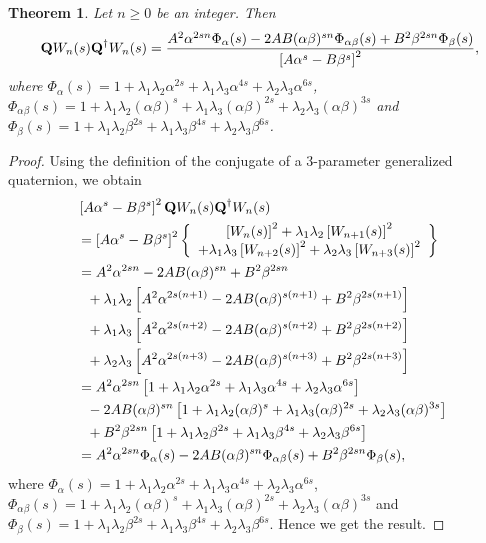 \documentclass{kms-c}
\theoremstyle{plain}
\newtheorem{theorem}{Theorem}[section]
\theoremstyle{definition}
\theoremstyle{remark}
\begin{document}
\begin{theorem}\label{t2}
Let $n\geq 0$ be an integer. Then
\[
\textnormal{\textbf{Q}}W_{n}(s)\textnormal{\textbf{Q}}^{\dagger}W_{n}(s)=\frac{A^{2}\alpha^{2sn}\Phi_{\alpha}(s)-2AB(\alpha\beta)^{sn}\Phi_{\alpha\beta}(s)+B^{2}\beta^{2sn}\Phi_{\beta}(s)}{\left[A\alpha^{s}-B\beta^{s}\right]^{2}},
\]
where $\Phi_{\alpha}(s)=1+\lambda_{1}\lambda_{2}\alpha^{2s}+\lambda_{1}\lambda_{3}\alpha^{4s}+\lambda_{2}\lambda_{3}\alpha^{6s}$, $\Phi_{\alpha\beta}(s)=1+\lambda_{1}\lambda_{2}(\alpha\beta)^{s}+\lambda_{1}\lambda_{3}(\alpha\beta)^{2s}+\lambda_{2}\lambda_{3}(\alpha\beta)^{3s}$ and $\Phi_{\beta}(s)=1+\lambda_{1}\lambda_{2}\beta^{2s}+\lambda_{1}\lambda_{3}\beta^{4s}+\lambda_{2}\lambda_{3}\beta^{6s}$.
\end{theorem}
\begin{proof}
Using the definition of the conjugate of a 3-parameter generalized quaternion, we obtain 
\begin{align*}
&\left[A\alpha^{s}-B\beta^{s}\right]^{2}\textnormal{\textbf{Q}}W_{n}(s)\textnormal{\textbf{Q}}^{\dagger}W_{n}(s)\\
&=\left[A\alpha^{s}-B\beta^{s}\right]^{2}\left\lbrace \begin{array}{c}  \left[W_{n}(s)\right]^{2}+\lambda_{1}\lambda_{2}\left[W_{n+1}(s)\right]^{2}\\
+ \lambda_{1}\lambda_{3}\left[W_{n+2}(s)\right]^{2}+\lambda_{2}\lambda_{3}\left[W_{n+3}(s)\right]^{2} \end{array} 
\right\rbrace \\
&=A^{2}\alpha^{2sn}-2AB(\alpha\beta)^{sn}+B^{2}\beta^{2sn}\\
&\ \ + \lambda_{1}\lambda_{2}\left[A^{2}\alpha^{2s(n+1)}-2AB(\alpha\beta)^{s(n+1)}+B^{2}\beta^{2s(n+1)}\right]\\
&\ \ + \lambda_{1}\lambda_{3}\left[A^{2}\alpha^{2s(n+2)}-2AB(\alpha\beta)^{s(n+2)}+B^{2}\beta^{2s(n+2)}\right]\\
&\ \ + \lambda_{2}\lambda_{3}\left[A^{2}\alpha^{2s(n+3)}-2AB(\alpha\beta)^{s(n+3)}+B^{2}\beta^{2s(n+3)}\right]\\
&=A^{2}\alpha^{2sn}\left[1+\lambda_{1}\lambda_{2}\alpha^{2s}+\lambda_{1}\lambda_{3}\alpha^{4s}+\lambda_{2}\lambda_{3}\alpha^{6s}\right]\\\
&\ \ - 2AB(\alpha\beta)^{sn}\left[1+\lambda_{1}\lambda_{2}(\alpha\beta)^{s}+\lambda_{1}\lambda_{3}(\alpha\beta)^{2s}+\lambda_{2}\lambda_{3}(\alpha\beta)^{3s}\right]\\
&\ \ + B^{2}\beta^{2sn}\left[1+\lambda_{1}\lambda_{2}\beta^{2s}+\lambda_{1}\lambda_{3}\beta^{4s}+\lambda_{2}\lambda_{3}\beta^{6s}\right]\\
&=A^{2}\alpha^{2sn}\Phi_{\alpha}(s)-2AB(\alpha\beta)^{sn}\Phi_{\alpha\beta}(s)+B^{2}\beta^{2sn}\Phi_{\beta}(s),
\end{align*}
where $\Phi_{\alpha}(s)=1+\lambda_{1}\lambda_{2}\alpha^{2s}+\lambda_{1}\lambda_{3}\alpha^{4s}+\lambda_{2}\lambda_{3}\alpha^{6s}$, $\Phi_{\alpha\beta}(s)=1+\lambda_{1}\lambda_{2}(\alpha\beta)^{s}+\lambda_{1}\lambda_{3}(\alpha\beta)^{2s}+\lambda_{2}\lambda_{3}(\alpha\beta)^{3s}$ and $\Phi_{\beta}(s)=1+\lambda_{1}\lambda_{2}\beta^{2s}+\lambda_{1}\lambda_{3}\beta^{4s}+\lambda_{2}\lambda_{3}\beta^{6s}$. Hence we get the result.
\end{proof}
\end{document}
